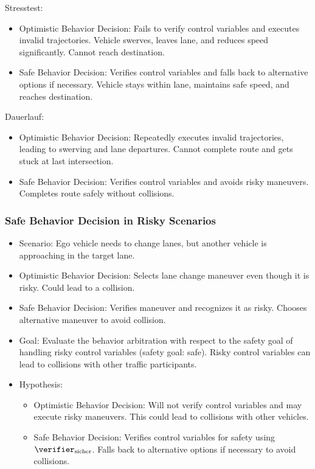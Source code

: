 Stresstest:

\begin{itemize}
    \item Optimistic Behavior Decision:
          Fails to verify control variables and executes invalid trajectories.
          Vehicle swerves, leaves lane, and reduces speed significantly.
          Cannot reach destination.
    \item Safe Behavior Decision:
          Verifies control variables and falls back to alternative options if necessary.
          Vehicle stays within lane, maintains safe speed, and reaches destination.
\end{itemize}

Dauerlauf:

\begin{itemize}
    \item Optimistic Behavior Decision:
          Repeatedly executes invalid trajectories, leading to swerving and lane departures.
          Cannot complete route and gets stuck at last intersection.
    \item Safe Behavior Decision:
          Verifies control variables and avoids risky maneuvers.
          Completes route safely without collisions.
\end{itemize}

\subsubsection*{Safe Behavior Decision in Risky Scenarios}

\begin{itemize}
    \item Scenario: Ego vehicle needs to change lanes, but another vehicle is approaching in the target lane.
    \item Optimistic Behavior Decision:
          Selects lane change maneuver even though it is risky.
          Could lead to a collision.
    \item Safe Behavior Decision:
          Verifies maneuver and recognizes it as risky.
          Chooses alternative maneuver to avoid collision.
    \item Goal: Evaluate the behavior arbitration with respect to the safety goal of handling risky control variables (safety goal: safe).
          Risky control variables can lead to collisions with other traffic participants.
    \item Hypothesis:

          \begin{itemize}
              \item Optimistic Behavior Decision: Will not verify control variables and may execute risky maneuvers.
                    This could lead to collisions with other vehicles.
              \item Safe Behavior Decision:
                    Verifies control variables for safety using $\verifier_\text{sicher}$.
                    Falls back to alternative options if necessary to avoid collisions.
          \end{itemize}
\end{itemize}

